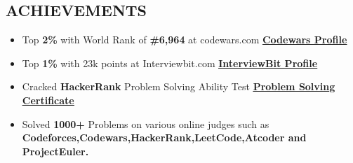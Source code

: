 \documentclass{res}[12pt]
\begin{document}
\begin{resume}
\section{\large{ACHIEVEMENTS}}
		\begin{itemize}
			\item Top \textbf{2\%} with World Rank of \textbf{\#6,964} 
				at codewars.com 
				\hspace{8.4mm}
		\href{https://www.codewars.com/users/vim1729}{\uline{\textbf{Codewars Profile}}}

			\item Top \textbf{1\%} with 23k points at Interviewbit.com 
				\hspace{23.4mm}
				\href{https://www.interviewbit.com/profile/vim1729}{\uline{\textbf{InterviewBit Profile}}}

			\item  Cracked \textbf{HackerRank} Problem Solving Ability Test
				\hspace{11.1mm}
				\href{https://www.hackerrank.com/certificates/359641cab60b}{\uline{\textbf{Problem Solving Certificate}}}
			
			\item Solved \textbf{1000+} Problems on various online judges such as \textbf{Codeforces,Codewars,HackerRank,LeetCode,Atcoder and ProjectEuler.}
		\end{itemize}
 
\end{resume}
\end{document}
